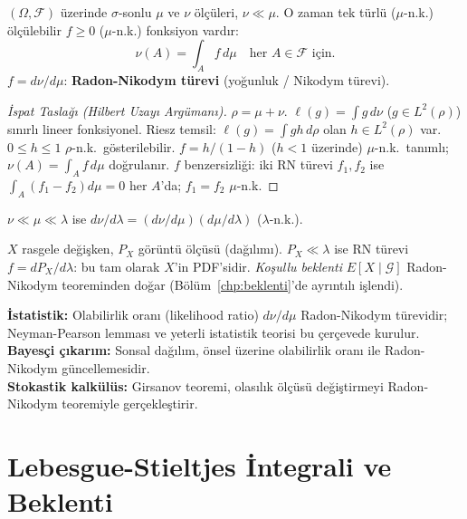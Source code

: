 \begin{teorem}
\label{thm:radon_nikodym}
$(\Omega, \mathcal{F})$ üzerinde $\sigma$-sonlu $\mu$ ve $\nu$ ölçüleri, $\nu \ll \mu$.
O zaman tek türlü ($\mu$-n.k.) ölçülebilir $f \geq 0$ ($\mu$-n.k.) fonksiyon vardır:
\[
  \nu(A) = \int_A f \, d\mu \quad \text{her } A \in \mathcal{F} \text{ için.}
\]
$f = d\nu/d\mu$: \textbf{Radon-Nikodym türevi} (yoğunluk / Nikodym türevi).
\end{teorem}

\begin{proof}[İspat Taslağı (Hilbert Uzayı Argümanı)]
$\rho = \mu + \nu$. $\ell(g) = \int g \, d\nu$ ($g \in L^2(\rho)$) sınırlı lineer fonksiyonel.
Riesz temsil: $\ell(g) = \int gh \, d\rho$ olan $h \in L^2(\rho)$ var.
$0 \leq h \leq 1$ $\rho$-n.k.\ gösterilebilir. $f = h/(1-h)$ ($h < 1$ üzerinde) $\mu$-n.k.\ tanımlı;
$\nu(A) = \int_A f \, d\mu$ doğrulanır. $f$ benzersizliği: iki RN türevi $f_1, f_2$
ise $\int_A(f_1-f_2)d\mu = 0$ her $A$'da; $f_1 = f_2$ $\mu$-n.k.
\end{proof}

\begin{onerme}
$\nu \ll \mu \ll \lambda$ ise $d\nu/d\lambda = (d\nu/d\mu)(d\mu/d\lambda)$ ($\lambda$-n.k.).
\end{onerme}

\begin{ornek}
$X$ rasgele değişken, $P_X$ görüntü ölçüsü (dağılımı). $P_X \ll \lambda$ ise
RN türevi $f = dP_X/d\lambda$: bu tam olarak $X$'in PDF'sidir.
\emph{Koşullu beklenti} $E[X \mid \mathcal{G}]$ Radon-Nikodym teoreminden doğar
(Bölüm~\ref{chp:beklenti}'de ayrıntılı işlendi).
\end{ornek}

\begin{disiplinlerarasibaglan}
\textbf{İstatistik:} Olabilirlik oranı (likelihood ratio) $d\nu/d\mu$ Radon-Nikodym türevidir;
Neyman-Pearson lemması ve yeterli istatistik teorisi bu çerçevede kurulur.\\
\textbf{Bayesçi çıkarım:} Sonsal dağılım, önsel üzerine olabilirlik oranı ile Radon-Nikodym güncellemesidir.\\
\textbf{Stokastik kalkülüs:} Girsanov teoremi, olasılık ölçüsü değiştirmeyi Radon-Nikodym teoremiyle gerçekleştirir.
\end{disiplinlerarasibaglan}

\section{Lebesgue-Stieltjes İntegrali ve Beklenti}
\label{sec:ls_integral}


